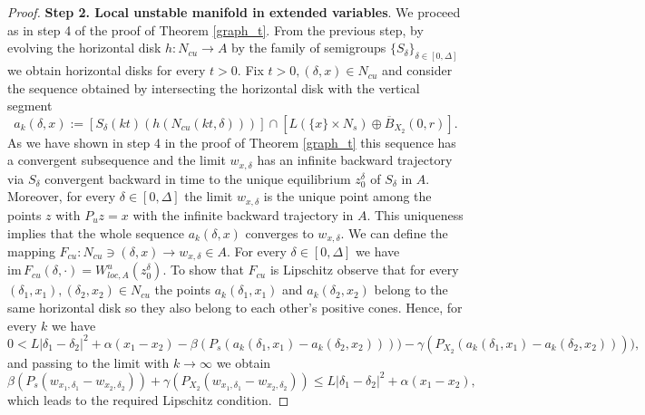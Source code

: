 \documentclass[11pt, leqno]{amsart}
\theoremstyle{definition}
\begin{document}
\begin{proof}
	
	\textbf{Step 2. Local unstable manifold in extended variables}. We proceed as in step 4 of the proof of Theorem \ref{graph_t}. From the previous step, by evolving the horizontal disk $h:N_{cu} \to A$ by the family of semigroups $\{S_\delta\}_{\delta\in [0,\Delta]}$ we obtain horizontal disks for every $t>0$. Fix $t > 0, (\delta,x) \in  N_{cu}$ and consider the sequence obtained by intersecting the horizontal disk with the vertical segment
	$$a_k(\delta,x) := \left[S_\delta(kt)(h(N_{cu}(kt,\delta)))\right] \cap \left[L \left( \{x\} \times N_s\right) \oplus \overline{B}_{X_2}(0,r)\right].$$ As we have shown in step 4 in the proof  of Theorem \ref{graph_t} this sequence has a convergent subsequence and the limit $w_{x,\delta}$ has an infinite backward trajectory via $S_\delta$ convergent backward in time to the unique equilibrium $z_0^\delta$ of $S_\delta$ in $A$. Moreover, for every $\delta\in [0,\Delta]$ the limit $w_{x,\delta}$ is the unique point among the points $z$ with $P_uz=x$ with the infinite backward trajectory in $A$. This uniqueness implies that the whole sequence $a_k(\delta,x)$ converges to $w_{x,\delta}$. We can define the mapping $F_{cu}:N_{cu}\ni (\delta,x)\to w_{x,\delta}\in A$. For every $\delta \in [0,\Delta]$ we have $\textrm{im}\, F_{cu}(\delta,\cdot) = W^u_{loc,A}(z^\delta_0)$.
	To show that $F_{cu}$ is Lipschitz observe that for every $(\delta_1,x_1),(\delta_2,x_2)\in N_{cu}$ the points $a_k(\delta_1, x_1)$ and $a_k(\delta_2,x_2)$  belong to the same horizontal disk so they also belong to each other's positive cones. Hence, for every $k$ we have
	$$
	0 < L|\delta_1-\delta_2|^2 + \alpha(x_1-x_2) - \beta(P_{s} (a_k(\delta_1, x_1)-a_k(\delta_2,x_2)))) - \gamma(P_{X_2} (a_k(\delta_1, x_1)-a_k(\delta_2,x_2)))),
	$$
	and passing to the limit with $k\to \infty$ we obtain
	$$
	\beta(P_{s} (w_{x_1,\delta_1}-w_{x_2,\delta_2})) + \gamma(P_{X_2} (w_{x_1,\delta_1}-w_{x_2,\delta_2})) \leq L|\delta_1-\delta_2|^2 + \alpha(x_1-x_2),
	$$
	which leads to the required Lipschitz condition.
	
\end{proof}
\end{document}
